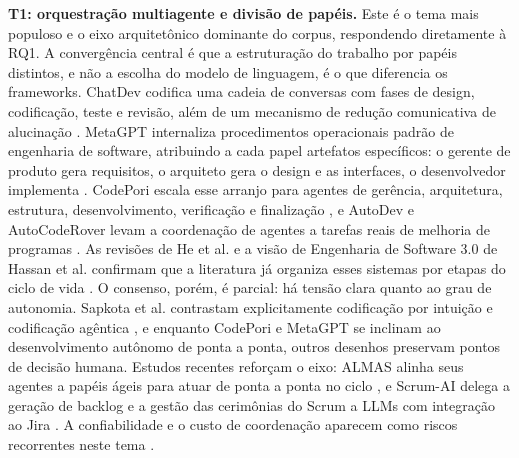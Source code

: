 \noindent\textbf{T1: orquestração multiagente e divisão de papéis.} Este é o tema mais populoso e o eixo arquitetônico dominante do corpus, respondendo diretamente à RQ1. A convergência central é que a estruturação do trabalho por papéis distintos, e não a escolha do modelo de linguagem, é o que diferencia os frameworks. ChatDev codifica uma cadeia de conversas com fases de design, codificação, teste e revisão, além de um mecanismo de redução comunicativa de alucinação \cite{ChenQian2023}. MetaGPT internaliza procedimentos operacionais padrão de engenharia de software, atribuindo a cada papel artefatos específicos: o gerente de produto gera requisitos, o arquiteto gera o design e as interfaces, o desenvolvedor implementa \cite{SiruiHong2023}. CodePori escala esse arranjo para agentes de gerência, arquitetura, estrutura, desenvolvimento, verificação e finalização \cite{ZeeshanRasheed2024}, e AutoDev e AutoCodeRover levam a coordenação de agentes a tarefas reais de melhoria de programas \cite{MicheleTufano2024,YuntongZhang2024}. As revisões de He et al. e a visão de Engenharia de Software 3.0 de Hassan et al. confirmam que a literatura já organiza esses sistemas por etapas do ciclo de vida \cite{JundaHe2025,AhmedEHassan2024}. O consenso, porém, é parcial: há tensão clara quanto ao grau de autonomia. Sapkota et al. contrastam explicitamente codificação por intuição e codificação agêntica \cite{RanjanSapkota2025}, e enquanto CodePori e MetaGPT se inclinam ao desenvolvimento autônomo de ponta a ponta, outros desenhos preservam pontos de decisão humana. Estudos recentes reforçam o eixo: ALMAS alinha seus agentes a papéis ágeis para atuar de ponta a ponta no ciclo \cite{Tawosi2025}, e Scrum-AI delega a geração de backlog e a gestão das cerimônias do Scrum a LLMs com integração ao Jira \cite{Erten2025}. A confiabilidade e o custo de coordenação aparecem como riscos recorrentes neste tema \cite{Dam2025,Alsegier2026,Merchant2025,Paduraru2026,SKaruppuchamy2026,Paiva2026,Akbar2025,LiyiCai2025,Anon2026,BESLEAGA2026}.

